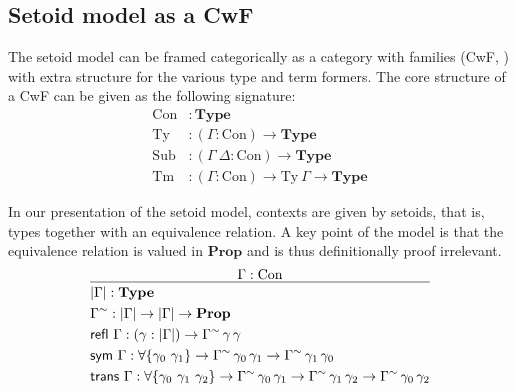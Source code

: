 \documentclass[a4paper,UKenglish,cleveref, autoref, thm-restate]{lipics-v2019}
\newcommand{\GG}{\Gamma}
\newcommand{\GD}{\Delta}
\newcommand{\mType}{\mathbf{Type}}
\newcommand{\mProp}{\mathbf{Prop}}
\newcommand{\Con}{\mathrm{Con}}
\newcommand{\Ty}{\mathrm{Ty}}
\newcommand{\Tm}{\mathrm{Tm}}
\newcommand{\Sub}{\mathrm{Sub}}
\begin{document}
\subsection{Setoid model as a CwF}

The setoid model can be framed categorically as a category with families (CwF,
\cite{internal-tt}) with extra structure for the various type and term
formers. The core structure of a CwF can be given as the following signature:
\begin{align*}
  \Con &: \mType \\
  \Ty &: (\GG : \Con) \to \mType \\
  \Sub &: (\GG\ \GD : \Con) \to \mType \\
  \Tm &: (\GG : \Con) \to \Ty\ \GG \to \mType
\end{align*}

In our presentation of the setoid model, contexts are given by setoids, that is,
types together with an equivalence relation. A key point of the model is that the
equivalence relation is valued in $\mProp$ and is thus definitionally proof
irrelevant.
\[
\infer{
  \begin{aligned}
    & | \GG | : \mType \\
    & \GG^\sim : | \GG | \to | \GG | \to \mProp \\
    & \textsf{refl}\ \GG : (\gamma : | \GG |) \to \GG^\sim\,\gamma\,\gamma \\
    & \textsf{sym} \ \GG : \forall\{\gamma_0\ \gamma_1\} \to \GG^\sim\,\gamma_0\,\gamma_1
    \to \GG^\sim\,\gamma_1\,\gamma_0 \\
    & \textsf{trans} \ \GG : \forall\{\gamma_0\ \gamma_1\ \gamma_2\}
    \to \GG^\sim\,\gamma_0\,\gamma_1
    \to \GG^\sim\,\gamma_1\,\gamma_2
    \to \GG^\sim\,\gamma_0\,\gamma_2
  \end{aligned}
}{
  \GG : \Con
}
\]
\end{document}
